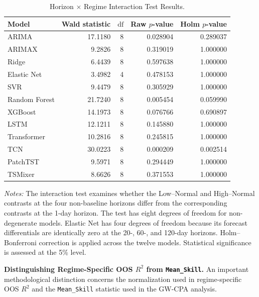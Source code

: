 \documentclass[12pt,twoside]{ord}
\begin{document}
\begin{table}[htbp]
\centering
\caption{Horizon $\times$ Regime Interaction Test Results.}\label{tab:h2_interaction}
\setlength{\tabcolsep}{6pt}
\begin{tabular}{lrrrr}
\hline
Model & Wald statistic & $\mathrm{df}$ & Raw $p$-value & Holm $p$-value \\
\hline
ARIMA         & 17.1180 & 8 & 0.028904 & 0.289037 \\
ARIMAX        &  9.2826 & 8 & 0.319019 & 1.000000 \\
Ridge         &  6.4439 & 8 & 0.597638 & 1.000000 \\
Elastic Net   &  3.4982 & 4 & 0.478153 & 1.000000 \\
SVR           &  9.4479 & 8 & 0.305929 & 1.000000 \\
Random Forest & 21.7240 & 8 & 0.005454 & 0.059990 \\
XGBoost       & 14.1973 & 8 & 0.076766 & 0.690897 \\
LSTM          & 12.1211 & 8 & 0.145880 & 1.000000 \\
Transformer   & 10.2816 & 8 & 0.245815 & 1.000000 \\
TCN           & 30.0223 & 8 & 0.000209 & 0.002514 \\
PatchTST      &  9.5971 & 8 & 0.294449 & 1.000000 \\
TSMixer       &  8.6626 & 8 & 0.371553 & 1.000000 \\
\hline
\end{tabular}
\par\vspace{4pt}\parbox{\linewidth}{\fontsize{9pt}{12pt}\selectfont\textit{Notes:} The interaction test examines whether the Low--Normal and High--Normal contrasts at the four non-baseline horizons differ from the corresponding contrasts at the 1-day horizon. The test has eight degrees of freedom for non-degenerate models. Elastic Net has four degrees of freedom because its forecast differentials are identically zero at the 20-, 60-, and 120-day horizons. Holm--Bonferroni correction is applied across the twelve models. Statistical significance is assessed at the 5\% level.}
\end{table}

\noindent\textbf{Distinguishing Regime-Specific OOS $R^2$ from \texttt{Mean\_Skill}.}
An important methodological distinction concerns the normalization used in regime-specific OOS $R^2$ and the \texttt{Mean\_Skill} statistic used in the GW-CPA analysis.
\end{document}
